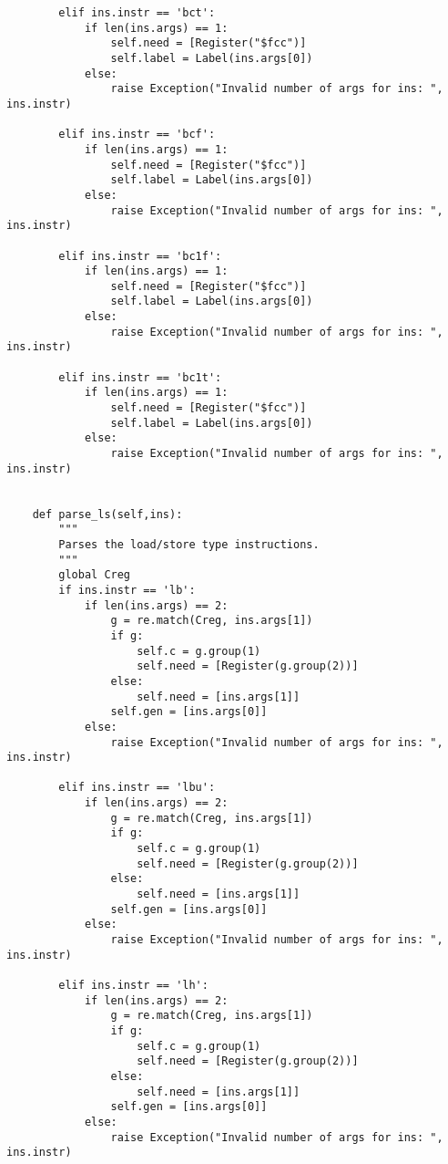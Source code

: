 \begin{lstlisting}
        elif ins.instr == 'bct':
            if len(ins.args) == 1:
                self.need = [Register("$fcc")]
                self.label = Label(ins.args[0])
            else:
                raise Exception("Invalid number of args for ins: ", ins.instr)
                
        elif ins.instr == 'bcf':
            if len(ins.args) == 1:
                self.need = [Register("$fcc")]
                self.label = Label(ins.args[0])
            else:
                raise Exception("Invalid number of args for ins: ", ins.instr)
                
        elif ins.instr == 'bc1f':
            if len(ins.args) == 1:
                self.need = [Register("$fcc")]
                self.label = Label(ins.args[0])
            else:
                raise Exception("Invalid number of args for ins: ", ins.instr)
                
        elif ins.instr == 'bc1t':
            if len(ins.args) == 1:
                self.need = [Register("$fcc")]
                self.label = Label(ins.args[0])
            else:
                raise Exception("Invalid number of args for ins: ", ins.instr)


    def parse_ls(self,ins):
        """
        Parses the load/store type instructions.
        """
        global Creg
        if ins.instr == 'lb':
            if len(ins.args) == 2:
                g = re.match(Creg, ins.args[1])
                if g:
                    self.c = g.group(1)
                    self.need = [Register(g.group(2))]
                else:
                    self.need = [ins.args[1]]
                self.gen = [ins.args[0]]
            else:
                raise Exception("Invalid number of args for ins: ", ins.instr) 
                       
        elif ins.instr == 'lbu':
            if len(ins.args) == 2:
                g = re.match(Creg, ins.args[1])
                if g:
                    self.c = g.group(1)
                    self.need = [Register(g.group(2))]
                else:
                    self.need = [ins.args[1]]
                self.gen = [ins.args[0]]
            else:
                raise Exception("Invalid number of args for ins: ", ins.instr)
                 
        elif ins.instr == 'lh':
            if len(ins.args) == 2:
                g = re.match(Creg, ins.args[1])
                if g:
                    self.c = g.group(1)
                    self.need = [Register(g.group(2))]
                else:
                    self.need = [ins.args[1]]
                self.gen = [ins.args[0]]
            else:
                raise Exception("Invalid number of args for ins: ", ins.instr)
                

\end{lstlisting}
